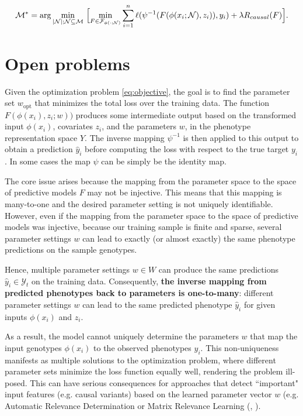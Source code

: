 \documentclass[12pt]{article}
\begin{document}
\begin{equation}
\label{eq:fine-mapping}
\mathcal{M}^* = \arg\min_{\vert \mathcal{N} \vert; \mathcal{N} \subseteq \mathcal{M}} 
 \ \Bigl[ \min_{F \in \mathcal{F}_{\phi(\cdot; \mathcal{N})}}
\sum_{i=1}^n \ell(\psi^{-1}(F(\phi(x_i; \mathcal{N}),z_i)),y_i) + \lambda R_{causal}(F) \Bigr].
\end{equation}



\section{Open problems}\label{Sec:open_problems}

Given the optimization problem \ref{eq:objective}, the goal is to find the parameter set  $w_{\text{opt}}$ that minimizes the total loss over the training data. The function $F(\phi(x_i),z_i;w))$ produces some intermediate output based on the transformed input $\phi(x_i)$, covariates $z_i$, and the parameters $w$, in the phenotype representation space $Y$. The inverse mapping $\psi^{-1}$ is then applied to this output to obtain a prediction $\hat{y}_i$ before computing the loss with respect to the true target $y_i$.  In some cases the map $\psi$ can be simply be the identity map.

The core issue arises because the mapping from the parameter space to the space of predictive models $F$ may not be injective. This means that this mapping is many-to-one and the desired parameter setting is not uniquely identifiable.
However, even if the mapping from the parameter space to the space of predictive models was injective, because our training sample is finite and sparse, several parameter settings $w$ can lead to exactly (or almost exactly) the same phenotype predictions on the sample genotypes.

Hence, multiple parameter settings $w \in W$ can produce the same predictions $\hat{y}_i \in \mathcal{Y}_t$ on the training data. Consequently, \textbf{the inverse mapping from predicted phenotypes back to parameters is one-to-many}: different parameter settings $w$ can lead to the same predicted phenotype $\hat{y}_i$ for given inputs $\phi(x_i)$ and $z_i$.

As a result, the model cannot uniquely determine the parameters $w$ that map the input genotypes $\phi(x_i)$ to the observed phenotypes $y_i$. This non-uniqueness manifests as multiple solutions to the optimization problem, where different parameter sets minimize the loss function equally well, rendering the problem ill-posed. This can have serious consequences for approaches that detect ``important" input features (e.g. causal variants) based on the learned parameter vector $w$ (e.g. Automatic Relevance Determination or Matrix Relevance Learning (\cite{Wipf2007ANV}, \cite{5430874}). 
\end{document}
